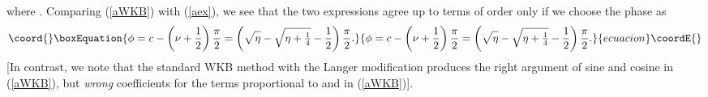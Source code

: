 \documentclass[a4paper,aps,eqsecnum,preprint,preprintnumbers,12pt]{revtex4}
\begin{document}
where \coordHE{}. Comparing
(\ref{aWKB}) with (\ref{aex}), we see that the two expressions
agree up to terms of order \coordHE{} only
if we choose the phase \myHighlight{$\phi$}\coordHE{} as
\begin{equation}\coord{}\boxEquation{ \label{phi}
\phi = c - \left( \nu + \frac{1}{2} \right) \frac{\pi}{2} = \left(
\sqrt{ \mathstrut \eta } - \sqrt{ \mathstrut \eta + \textstyle
\frac{1}{4} } - \frac{1}{2} \right) \frac{\pi}{2}.
}{ \phi = c - \left( \nu + \frac{1}{2} \right) \frac{\pi}{2} = \left(
\sqrt{ \mathstrut \eta } - \sqrt{ \mathstrut \eta + \textstyle
\frac{1}{4} } - \frac{1}{2} \right) \frac{\pi}{2}.
}{ecuacion}\coordE{}\end{equation}
[In contrast, we note that the standard WKB method with the Langer
modification produces the right argument of sine and cosine in
(\ref{aWKB}), but {\it wrong} coefficients for the terms
proportional to \coordHE{} and \coordHE{} in (\ref{aWKB})].
\end{document}
